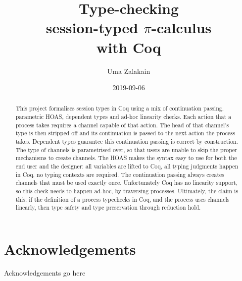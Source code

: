 \documentclass{mproj}
\newcommand{\picalc}{$\pi$-calculus}
\begin{document}
\title{Type-checking\\ session-typed \picalc \\ with Coq}
\author{Uma Zalakain}
\date{2019-09-06}
\maketitle

\begin{abstract}
    This project formalises session types in Coq using a mix of continuation
    passing, parametric HOAS, dependent types and ad-hoc linearity checks. Each
    action that a process takes requires a channel capable of that action. The
    head of that channel's type is then stripped off and its continuation is
    passed to the next action the process takes. Dependent types guarantee this
    continuation passing is correct by construction. The type of channels is
    parametrised over, so that users are unable to skip the proper mechanisms to
    create channels. The HOAS makes the syntax easy to use for both the end user
    and the designer: all variables are lifted to Coq, all typing judgments
    happen in Coq, no typing contexts are required. The continuation passing
    always creates channels that must be used exactly once. Unfortunately Coq
    has no linearity support, so this check needs to happen ad-hoc, by
    traversing processes. Ultimately, the claim is this: if the definition of a
    process typechecks in Coq, and the process uses channels linearly, then type
    safety and type preservation through reduction hold.
\end{abstract}

\educationalconsent
\vfill{}
\doclicenseThis
\newpage

\section*{Acknowledgements}

Acknowledgements go here

\tableofcontents
\end{document}
